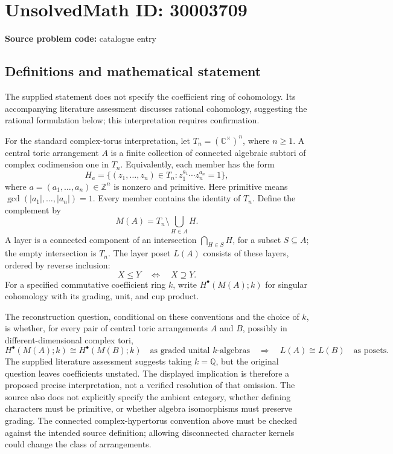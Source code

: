 \documentclass[11pt]{article}
\newcommand{\Z}{\mathbb{Z}}
\newcommand{\Q}{\mathbb{Q}}
\newcommand{\C}{\mathbb{C}}
\begin{document}
\section*{UnsolvedMath ID: 30003709}
\textbf{Source problem code:} catalogue entry
\subsection{Definitions and mathematical statement}
The supplied statement does not specify the coefficient ring of cohomology. Its accompanying literature assessment discusses rational cohomology, suggesting the rational formulation below; this interpretation requires confirmation.

For the standard complex-torus interpretation, let \(T_n=(\C^\times)^n\), where \(n\geq 1\). A central toric arrangement \(A\) is a finite collection of connected algebraic subtori of complex codimension one in \(T_n\). Equivalently, each member has the form
\[
H_a=\{(z_1,\ldots,z_n)\in T_n:z_1^{a_1}\cdots z_n^{a_n}=1\},
\]
where \(a=(a_1,\ldots,a_n)\in\Z^n\) is nonzero and primitive. Here primitive means \(\gcd(|a_1|,\ldots,|a_n|)=1\). Every member contains the identity of \(T_n\). Define the complement by
\[
M(A)=T_n\setminus\bigcup_{H\in A}H.
\]
A layer is a connected component of an intersection \(\bigcap_{H\in S}H\), for a subset \(S\subseteq A\); the empty intersection is \(T_n\). The layer poset \(L(A)\) consists of these layers, ordered by reverse inclusion:
\[
X\leq Y\quad\Longleftrightarrow\quad X\supseteq Y.
\]
For a specified commutative coefficient ring \(k\), write \(H^\bullet(M(A);k)\) for singular cohomology with its grading, unit, and cup product.

The reconstruction question, conditional on these conventions and the choice of \(k\), is whether, for every pair of central toric arrangements \(A\) and \(B\), possibly in different-dimensional complex tori,
\[
H^\bullet(M(A);k)\cong H^\bullet(M(B);k)
\quad\text{as graded unital }k\text{-algebras}
\quad\Longrightarrow\quad
L(A)\cong L(B)\quad\text{as posets}.
\]
The supplied literature assessment suggests taking \(k=\Q\), but the original question leaves coefficients unstated. The displayed implication is therefore a proposed precise interpretation, not a verified resolution of that omission. The source also does not explicitly specify the ambient category, whether defining characters must be primitive, or whether algebra isomorphisms must preserve grading. The connected complex-hypertorus convention above must be checked against the intended source definition; allowing disconnected character kernels could change the class of arrangements.
\end{document}
